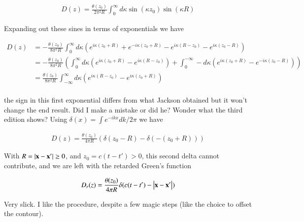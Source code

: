\begin{align}\label{eqn:jacksonRet:boo16}
D(z) = \frac{\theta(z_0)}{2 \pi^2 R} \int_0^\infty d\kappa \sin(\kappa z_0) \sin(\kappa R)
\end{align}

Expanding out these sines in terms of exponentials we have

\begin{align*}
D(z) 
&= -\frac{\theta(z_0)}{8 \pi^2 R} \int_0^\infty d\kappa ( e^{i\kappa(z_0+R)} + e^{-i\kappa(z_0+R)} -e^{i\kappa(R-z_0)} - e^{i\kappa(z_0-R)} ) \\
&= -\frac{\theta(z_0)}{8 \pi^2 R} \left(
\int_0^\infty d\kappa \left( e^{i\kappa(z_0+R)} -e^{i\kappa(R-z_0)} \right) 
+\int_0^{-\infty} -d\kappa \left( e^{i\kappa(z_0+R)} - e^{-i\kappa(z_0-R)} \right) 
\right)
\\
&= \frac{\theta(z_0)}{8 \pi^2 R} \int_{-\infty}^\infty d\kappa \left( e^{i\kappa(R-z_0)} -e^{i\kappa(z_0+R)} \right) 
\\
\end{align*}

the sign in this first exponential differs from what Jackson obtained but it won't change the end result.  Did I make a mistake or did he?  Wonder what the third edition shows?  Using $\delta(x) = \int e^{-ikx} dk/2\pi$ we have

\begin{align}\label{eqn:jacksonRet:boo17}
D(z) = \frac{\theta(z_0)}{4 \pi R} \left( \delta(z_0 -R) - \delta(-(z_0 + R)) \right)
\end{align}

With $R = \left\lvert{\mathbf{x}- \mathbf{x}'}\right\rvert \ge 0$, and $z_0 = c(t - t') > 0$, this second delta cannot contribute, and we are left with the retarded Green's function

\begin{align}\label{eqn:jacksonRet:boo18}
D_r(z) = \frac{\theta(z_0)}{4 \pi R} \delta(c(t -t') - \left\lvert{\mathbf{x}- \mathbf{x}'}\right\rvert) 
\end{align}

Very slick.  I like the procedure, despite a few magic steps (like the choice to offset the contour).

\EndArticle
